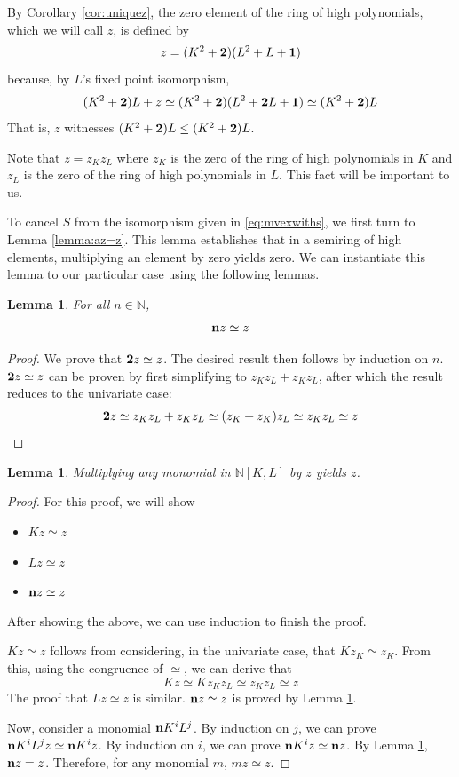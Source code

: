 \documentclass{msthesis}
\newtheorem{lemma}[theorem]{Lemma}
\theoremstyle{definition}
\newcommand{\nat}{\mathbb{N}}
\begin{document}
By Corollary \ref{cor:uniquez}, the zero element of the ring of high polynomials, which we will call $z$, is defined by
\[ z = (K^2 + \mathbf{2})(L^2 + L + \mathbf{1}) \]
because, by $L$'s fixed point isomorphism, 
\[ (K^2 + \mathbf{2})L + z \simeq (K^2 + \mathbf{2})(L^2 + \mathbf{2}L + \mathbf{1}) \simeq (K^2 + \mathbf{2})L \]
That is, $z$ witnesses $(K^2+\mathbf{2})L \le (K^2+\mathbf{2})L$.

Note that $z = z_Kz_L$ where $z_K$ is the zero of the ring of high polynomials in $K$ and $z_L$ is the zero of the ring of high polynomials in $L$.  This fact will be important to us.

To cancel $S$ from the isomorphism given in \eqref{eq:mvexwiths}, we first turn to Lemma \ref{lemma:az=z}.  This lemma establishes that in a semiring of high elements, multiplying an element by zero yields zero.  We can instantiate this lemma to our particular case using the following lemmas.

\begin{lemma}\label{lemma:z+z=z}
For all $n \in \nat$,
\[ \mathbf{n}z \simeq z\]
\end{lemma}
\begin{proof}
    We prove that $\mathbf{2}z \simeq z$. The desired result then follows by induction on $n$.
    $\mathbf{2}z \simeq z$ can be proven by first simplifying to $z_Kz_L + z_Kz_L$, after which the result reduces to the univariate case:
    \[ \mathbf{2}z \simeq z_Kz_L + z_Kz_L \simeq (z_K + z_K)z_L \simeq z_Kz_L \simeq z \qedhere\]
\end{proof}

\begin{lemma}\label{lemma:mz=z}
    Multiplying any monomial in $\nat[K,L]$ by $z$ yields $z$.
\end{lemma}
\begin{proof}
    For this proof, we will show
    \begin{itemize}[nosep]
        \item $Kz \simeq z$
        \item $Lz \simeq z$
        \item $\mathbf{n}z \simeq z$
    \end{itemize}
    After showing the above, we can use induction to finish the proof.
    
    $Kz \simeq z$ follows from considering, in the univariate case, that $Kz_K \simeq z_K$.  From this, using the congruence of $\simeq$, we can derive that 
    \[ Kz \simeq Kz_Kz_L \simeq z_Kz_L \simeq z \]
    The proof that $Lz \simeq z$ is similar.
    $\mathbf{n}z \simeq z$ is proved by Lemma \ref{lemma:z+z=z}.
    

    Now, consider a monomial $\mathbf{n}K^iL^j$.  By induction on $j$, we can prove $\mathbf{n}K^iL^jz \simeq \mathbf{n}K^iz$. By induction on $i$, we can prove $\mathbf{n}K^iz \simeq \mathbf{n}z$.  By Lemma \ref{lemma:z+z=z}, $\mathbf{n}z = z$.  Therefore, for any monomial $m$, $mz \simeq z$.
\end{proof}
\end{document}
